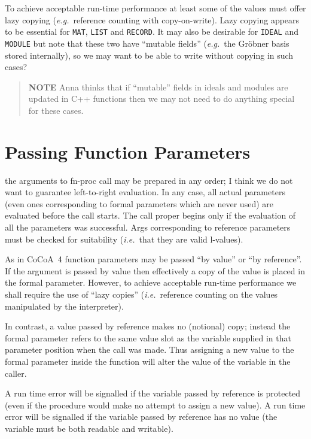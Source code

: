 \documentclass{book}[12,a4paper]
\def\ie{{\it i.e.}}
\def\eg{{\it e.g.}}
\begin{document}
To achieve acceptable run-time performance at least some of the values must offer
lazy copying (\eg~reference counting with copy-on-write).  Lazy copying appears
to be essential for \texttt{MAT}, \texttt{LIST} and \texttt{RECORD}.  It may also be
desirable for \texttt{IDEAL} and \texttt{MODULE} but note that these two have ``mutable
fields'' (\eg~the Gr\"obner basis stored internally), so we may want to be able to
write without copying in such cases?

\begin{quote}
  {\bf NOTE} Anna thinks that if ``mutable'' fields in ideals and modules
  are updated in C++ functions then we may not need to do anything special
  for these cases.
\end{quote}


\section{Passing Function Parameters}

 the arguments to fn-proc call may be prepared in any
order; I think we do not want to guarantee left-to-right evaluation.  In
any case, all actual parameters (even ones corresponding to formal
parameters which are never used) are evaluated before the call starts.
The call proper begins only if the evaluation of all the parameters was
successful.  Args corresponding to reference parameters must be checked for
suitability (\ie~that they are valid l-values).
\medskip

As in CoCoA~4 function parameters may be passed ``by value'' or ``by reference''.
If the argument is passed by value then effectively a copy of the value is placed in
the formal parameter.  However, to achieve acceptable run-time performance we
shall require the use of ``lazy copies'' (\ie~reference counting on the values
manipulated by the interpreter).

In contrast, a value passed by reference makes no (notional) copy; instead the
formal parameter refers to the same value slot as the variable supplied in that
parameter position when the call was made.  Thus assigning a new value to the
formal parameter inside the function will alter the value of the variable in
the caller.

A run time error will be signalled if the variable passed by reference is
protected (even if the procedure would make no attempt to assign a new value).
A run time error will be signalled if the variable passed by reference has
no value (the variable must be both readable and writable).
\end{document}
